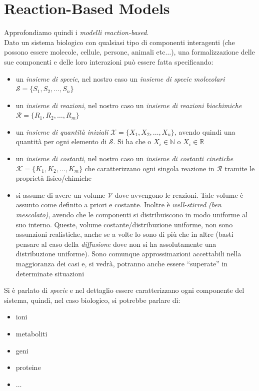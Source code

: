 \documentclass[a4paper,12pt, oneside]{book}
\begin{document}
\section{Reaction-Based Models}
Approfondiamo quindi i \textit{modelli reaction-based}.\\
Dato un sistema biologico con qualsiasi tipo di componenti interagenti (che
possono essere molecole, cellule, persone, animali etc$\ldots$), una
formalizzazione delle sue componenti e delle loro interazioni può essere fatta
specificando:
\begin{itemize}
  \item un \textit{insieme di specie}, nel nostro caso un \textit{insieme di
    specie molecolari} $\mathcal{S}=\{S_1,S_2,\ldots, S_n\}$
  \item un \textit{insieme di reazioni}, nel nostro caso un \textit{insieme di
    reazioni biochimiche} $\mathcal{R}=\{R_1,R_2,\ldots, R_m\}$
  \item un \textit{insieme di quantità iniziali} $\mathcal{X}=\{X_1,X_2,\ldots,
  X_n\}$, avendo quindi una quantità per ogni elemento di $\mathcal{S}$. Si ha
  che o $X_i\in \mathbb{N}$ o $X_i\in\mathbb{R}$
  \item un \textit{insieme di costanti}, nel nostro caso un \textit{insieme di
    costanti cinetiche} $\mathcal{K}=\{K_1,K_2,\ldots, K_m\}$ che caratterizzano
  ogni singola reazione in $\mathcal{R}$ tramite le proprietà
  fisico/chimiche
  \item si assume di avere un volume $\mathcal{V}$ dove avvengono le
  reazioni. Tale volume è assunto come definito a priori e costante. Inoltre è
  \textit{well-stirred (ben mescolato)}, avendo che le componenti si
  distribuiscono in modo uniforme al suo interno. Queste, volume
  costante/distribuzione uniforme, non sono assunzioni
  realistiche, anche se a volte lo sono di più che in altre (basti pensare al
  caso della \textit{diffusione} dove non si ha assolutamente una distribuzione
  uniforme). Sono comunque approssimazioni accettabili nella maggioranza dei
  casi e, si vedrà, potranno anche essere ``superate'' in determinate situazioni
\end{itemize}
Si è parlato di \textit{specie} e nel dettaglio essere caratterizzano ogni
componente del sistema, quindi, nel caso biologico, si potrebbe parlare di:
\begin{itemize}
  \item ioni
  \item metaboliti
  \item geni
  \item proteine
  \item $\ldots$
\end{itemize}
\end{document}
